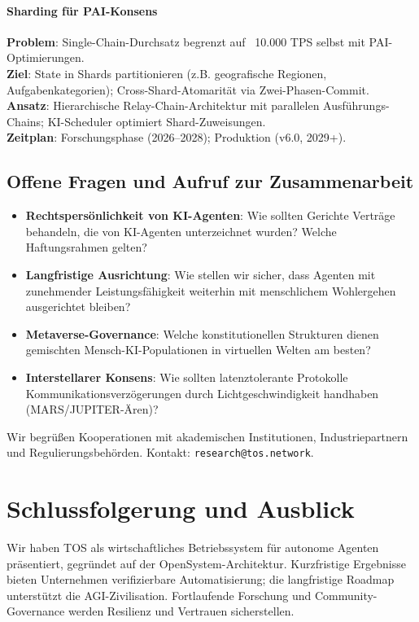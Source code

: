 \documentclass[11pt]{article}
\begin{document}
\paragraph{Sharding für PAI-Konsens}
\textbf{Problem}: Single-Chain-Durchsatz begrenzt auf ~10.000 TPS selbst mit PAI-Optimierungen.\\
\textbf{Ziel}: State in Shards partitionieren (z.B. geografische Regionen, Aufgabenkategorien); Cross-Shard-Atomarität via Zwei-Phasen-Commit.\\
\textbf{Ansatz}: Hierarchische Relay-Chain-Architektur mit parallelen Ausführungs-Chains; KI-Scheduler optimiert Shard-Zuweisungen.\\
\textbf{Zeitplan}: Forschungsphase (2026--2028); Produktion (v6.0, 2029+).

\subsection{Offene Fragen und Aufruf zur Zusammenarbeit}

\begin{itemize}[noitemsep]
  \item \textbf{Rechtspersönlichkeit von KI-Agenten}: Wie sollten Gerichte Verträge behandeln, die von KI-Agenten unterzeichnet wurden? Welche Haftungsrahmen gelten?
  \item \textbf{Langfristige Ausrichtung}: Wie stellen wir sicher, dass Agenten mit zunehmender Leistungsfähigkeit weiterhin mit menschlichem Wohlergehen ausgerichtet bleiben?
  \item \textbf{Metaverse-Governance}: Welche konstitutionellen Strukturen dienen gemischten Mensch-KI-Populationen in virtuellen Welten am besten?
  \item \textbf{Interstellarer Konsens}: Wie sollten latenztolerante Protokolle Kommunikationsverzögerungen durch Lichtgeschwindigkeit handhaben (MARS/JUPITER-Ären)?
\end{itemize}

Wir begrüßen Kooperationen mit akademischen Institutionen, Industriepartnern und Regulierungsbehörden. Kontakt: \texttt{research@tos.network}.

\section{Schlussfolgerung und Ausblick}
Wir haben TOS als wirtschaftliches Betriebssystem für autonome Agenten präsentiert, gegründet auf der OpenSystem-Architektur. Kurzfristige Ergebnisse bieten Unternehmen verifizierbare Automatisierung; die langfristige Roadmap unterstützt die AGI-Zivilisation. Fortlaufende Forschung und Community-Governance werden Resilienz und Vertrauen sicherstellen.
\end{document}
